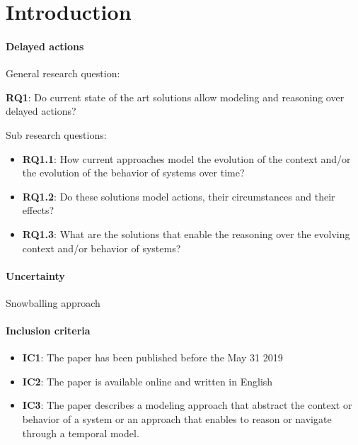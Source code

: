 \section{Introduction}

\paragraph{Delayed actions}
General research question:
\begin{center}
	\textbf{RQ1}: Do current state of the art solutions allow modeling and reasoning over delayed actions?  
\end{center}

Sub research questions:
\begin{itemize}
	\item \textbf{RQ1.1}: How current approaches model the evolution of the context and/or the evolution of the behavior of systems over time?
	\item \textbf{RQ1.2}: Do these solutions model actions, their circumstances and their effects?
	\item \textbf{RQ1.3}: What are the solutions that enable the reasoning over the evolving context and/or behavior of systems?
\end{itemize}


\paragraph{Uncertainty}

Snowballing approach~\cite{DBLP:conf/ease/Wohlin14}

\paragraph{Inclusion criteria}
\begin{itemize}
	\item \textbf{IC1}: The paper has been published before the May 31 2019
	\item \textbf{IC2}: The paper is available online and written in English
	\item \textbf{IC3}: The paper describes a modeling approach that abstract the context or behavior of a system or an approach that enables to reason or navigate through a temporal model.
\end{itemize}

